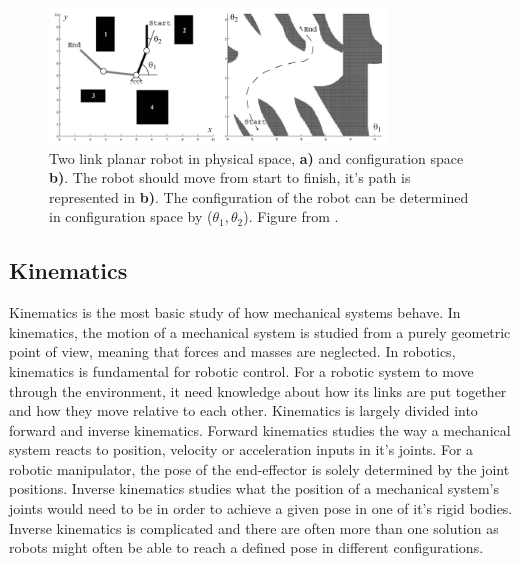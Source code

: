 \begin{figure}[htp]
  \centering
  \includegraphics[width = 0.8\textwidth]{Figures/figConfSpace.pdf}
  \caption{Two link planar robot in physical space, \textbf{a)} and configuration space \textbf{b)}. The robot should move from start to finish, it's path is represented in \textbf{b)}. The configuration of the robot can be determined in configuration space by ($\theta_1, \theta_2$). Figure from \cite{SiegwartRoland2011Itam}.}
  \label{fig:T:RC:CSpace}
\end{figure}

\subsection{Kinematics}
Kinematics is the most basic study of how mechanical systems behave\cite{SiegwartRoland2011Itam}. In kinematics, the motion of a mechanical system is studied from a purely geometric point of view, meaning that forces and masses are neglected. In robotics, kinematics is fundamental for robotic control. For a robotic system to move through the environment, it need knowledge about how  its links are put together and how they move relative to each other. Kinematics is largely divided into forward and inverse kinematics. Forward kinematics studies the way a mechanical system reacts to position, velocity or acceleration inputs in it's joints. For a robotic manipulator, the pose of the end-effector is solely determined by the joint positions. Inverse kinematics studies what the position of a mechanical system's joints would need to be in order to achieve a given pose in one of it's rigid bodies. Inverse kinematics is complicated and there are often more than one solution as robots might often be able to reach a defined pose in different configurations.

